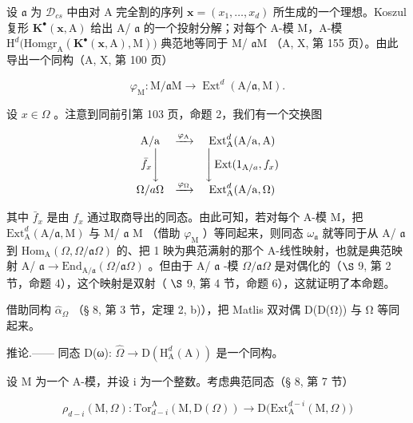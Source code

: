 设 \(\mathfrak{a}\) 为 \(\mathcal{D}_{cs}\) 中由对 A 完全割的序列 \(\mathbf{x} = (x_1, \ldots, x_d)\) 所生成的一个理想。Koszul 复形 \(\mathbf{K}^{\bullet}(\mathbf{x}, \mathrm{A})\) 给出 A/ \(\mathfrak{a}\) 的一个投射分解；对每个 A-模 M，A-模 \(\mathrm{H}^d\big(\mathrm{Homgr}_\mathrm{A}(\mathbf{K}^{\bullet}(\mathbf{x}, \mathrm{A}), \mathrm{M})\big)\) 典范地等同于 M/ \(\mathfrak{a}\mathrm{M}\) （A, X, 第 155 页）。由此导出一个同构（A, X, 第 100 页）

\[
\varphi_ {\mathrm{M}}: \mathrm{M} / \mathfrak {a} \mathrm{M} \longrightarrow \operatorname{Ext} ^ {d} (\mathrm{A} / \mathfrak {a}, \mathrm{M}).
\]

设 \(x \in \Omega\) 。注意到同前引第 103 页，命题 2，我们有一个交换图

\[
\begin{array}{c c c} \mathrm{A/a} & \xrightarrow {\varphi_ {\mathrm{A}}} & \operatorname{Ext} _ {\mathrm{A}} ^ {d} (\mathrm{A/a}, \mathrm{A}) \\ \bar {f} _ {x} \Bigg \downarrow & & \Bigg \downarrow \operatorname{Ext} (1 _ {\mathrm{A} / a}, f _ {x}) \\ \Omega / a \Omega & \xrightarrow {\varphi_ {\Omega}} & \operatorname{Ext} _ {\mathrm{A}} ^ {d} (\mathrm{A/a}, \Omega) \end{array}
\]

其中 \(\bar{f}_x\) 是由 \(f_x\) 通过取商导出的同态。由此可知，若对每个 A-模 M，把 \(\mathrm{Ext}_{\mathrm{A}}^{d}(\mathrm{A}/\mathfrak{a},\mathrm{M})\) 与 M/ \(\mathfrak{a}\) M （借助 \(\varphi_{\mathrm{M}}\) ）等同起来，则同态 \(\omega_{\mathfrak{a}}\) 就等同于从 A/ \(\mathfrak{a}\) 到 \(\mathrm{Hom}_{\mathrm{A}}(\Omega,\Omega/\mathfrak{a}\Omega)\) 的、把 1 映为典范满射的那个 A-线性映射，也就是典范映射 A/ \(\mathfrak{a}\longrightarrow\mathrm{End}_{\mathrm{A}/\mathfrak{a}}(\Omega/\mathfrak{a}\Omega)\) 。但由于 A/ \(\mathfrak{a}\) -模 \(\Omega/\mathfrak{a}\Omega\) 是对偶化的（\(\S\) 9, 第 2 节，命题 4），这个映射是双射（ \(\S\) 9, 第 4 节，命题 6），这就证明了本命题。

借助同构 \(\widehat{\alpha}_{\Omega}\) （§ 8, 第 3 节，定理 2, b)），把 Matlis 双对偶 D(D(Ω)) 与 Ω 等同起来。

推论.—— 同态 D(ω): \(\widehat{\Omega} \rightarrow \mathrm{D}(\mathrm{H}_{\mathrm{A}}^{d}(\mathrm{A}))\) 是一个同构。

设 M 为一个 A-模，并设 i 为一个整数。考虑典范同态（§ 8, 第 7 节）

\[
\rho_ {d - i} (\mathrm{M}, \Omega): \mathrm{Tor} _ {d - i} ^ {\mathrm{A}} (\mathrm{M}, \mathrm{D} (\Omega)) \longrightarrow \mathrm{D} \big (\mathrm{Ext} _ {\mathrm{A}} ^ {d - i} (\mathrm{M}, \Omega) \big)
\]

